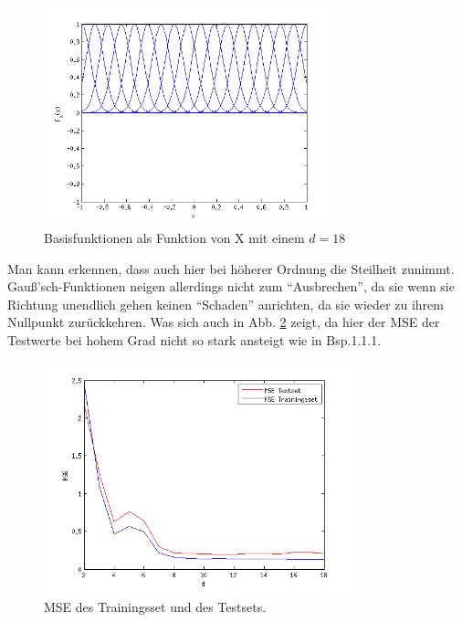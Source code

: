 \begin{figure}[h!]
\begin{center}
 \includegraphics[width=0.75\textwidth]{./figures/RBF_18}
 \caption[Basisfunktionen als Funktion von X, d=18]{Basisfunktionen als Funktion von X mit einem $d=18$}
\label{fig:RBF_18}
\end{center}
\end{figure}

Man kann erkennen, dass auch hier bei höherer Ordnung die Steilheit zunimmt. Gau\ss{}'sch-Funktionen neigen allerdings nicht zum ``Ausbrechen'',
da sie wenn sie Richtung unendlich gehen keinen ``Schaden'' anrichten, da sie wieder zu ihrem Nullpunkt zurückkehren.
Was sich auch in Abb. \ref{fig:RBF_MSE} zeigt, da hier der MSE der Testwerte bei hohem Grad nicht so stark ansteigt wie in Bsp.1.1.1.
 

\begin{figure}[h!]
\begin{center}
 \includegraphics[width=0.8\textwidth]{./figures/RBF_MSE}
 \caption[MSE]{MSE des Trainingsset und des Testsets.}
\label{fig:RBF_MSE}
\end{center}
\end{figure}
\clearpage

